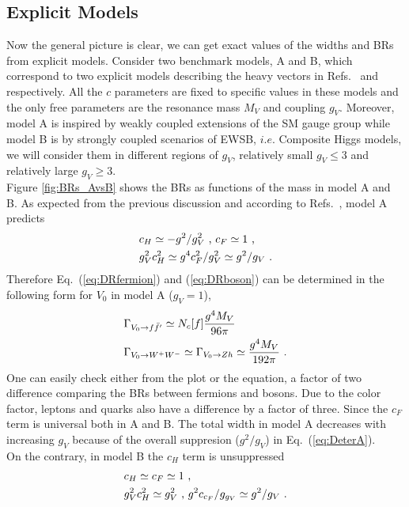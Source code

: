 \subsection{Explicit Models}
Now the general picture is clear, we can get exact values of the widths and BRs from explicit models. Consider two benchmark models, A and B, which correspond to two explicit models describing the heavy vectors in Refs.~\cite{modelA} and \cite{compositehiggs-1} respectively. All the $c$ parameters are fixed to specific values in these models and the only free parameters are the resonance mass $M_{V}$ and coupling $g_{V}$. Moreover, model A is inspired by weakly coupled extensions of the SM gauge group while model B is by strongly coupled scenarios of EWSB, $i.e.$ Composite Higgs models, we will consider them in different regions of $g_{V}$, relatively small $g_{V}\leq3$ and relatively large $g_{V}\geq3$.\\
\newline Figure \ref{fig:BRs_AvsB} shows the BRs as functions of the mass in model A and B. As expected from the previous discussion and according to Refs.~\cite{modelA}, model A predicts
\begin{align}
  \label{eq:DeterA}
  &c_{H}\simeq-g^{2}/g_{V}^{2}\textup{ , }c_{F}\simeq 1 \textup{ ,} \nonumber\\
  &g_{V}^{2}c_{H}^{2}\simeq g^{4}c_{F}^{2}/g_{V}^{2}\simeq g^{2}/g_{V}\textup{ .}
\end{align}
Therefore Eq.~(\ref{eq:DRfermion}) and (\ref{eq:DRboson}) can be determined in the following form for $V_{0}$ in model A ($g_{V}=1$),
\begin{align}
  &\Gamma_{V_{0}\rightarrow f\bar{f}'}\simeq N_{c}[f]\frac{g^{4}M_{V}}{96\pi}\nonumber\\
  &\Gamma_{V_{0}\rightarrow W^{+}W^{-}}\simeq \Gamma_{V_{0}\rightarrow Zh}\simeq \frac{g^{4}M_{V}}{192\pi}\textup{ .}
\end{align}
One can easily check either from the plot or the equation, a factor of two difference comparing the BRs between fermions and bosons. Due to the color factor, leptons and quarks also have a difference by a factor of three. Since the $c_{F}$ term is universal both in A and B. The total width in model A decreases with increasing $g_{V}$ because of the overall suppresion ($g^{2}/g_{V}$) in Eq.~(\ref{eq:DeterA}).\\On the contrary, in model B the $c_{H}$ term is unsuppressed
\begin{align}
  \label{eq:DeterB}
  &c_{H}\simeq c_{F}\simeq 1 \textup{ ,}\nonumber\\
  &g_{V}^{2}c_{H}^{2}\simeq g_{V}^{2}\textup{ , }g^{2}c_{c_{F}}/g_{g_{V}}\simeq g^{2}/g_{V}\textup{ .}
\end{align}
